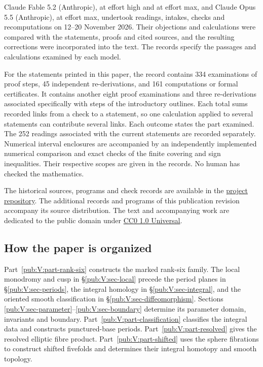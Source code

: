 Claude Fable 5.2 (Anthropic), at effort high and at effort max, and
Claude Opus 5.5 (Anthropic), at effort max, undertook readings, intakes,
checks and recomputations on 12--20 November 2026. Their objections
and calculations were compared with the statements, proofs and cited
sources, and the resulting corrections were incorporated into the text.
The records specify the passages and calculations examined by each model.

For the statements printed in this paper, the record contains
334 examinations of proof steps, 45 independent re-derivations, and
161 computations or formal certificates. It contains another eight
proof examinations and three re-derivations associated specifically
with steps of the introductory outlines. Each total sums recorded
links from a check to a statement, so one calculation applied to several
statements can contribute several links. Each outcome states the part
examined. The 252 readings associated with the current statements are
recorded separately. Numerical interval enclosures are accompanied by
an independently implemented numerical comparison and exact checks of
the finite covering and sign inequalities. Their respective scopes are
given in the records. No human has checked the mathematics.

The historical sources, programs and check records are available in the
\href{https://github.com/KokunoYumeto/s6-complex-structure-workbench/tree/\SsixRepositoryCommit/pro_returns/S6_SERIES_GRIND_checkpoint_10_20261120T0211Z/}{project repository}.
The additional records and programs of this publication revision
accompany its source distribution.
The text and accompanying work are dedicated to the public domain under
\href{https://creativecommons.org/publicdomain/zero/1.0/}{CC0 1.0 Universal}.

\subsection{How the paper is organized}
Part~\ref{pub:V:part-rank-six} constructs the marked rank-six family.
The local monodromy and cusp in \S\ref{pub:V:sec-local} precede the
period planes in \S\ref{pub:V:sec-periods}, the integral homology in
\S\ref{pub:V:sec-integral}, and the oriented smooth classification
in \S\ref{pub:V:sec-diffeomorphism}. Sections
\ref{pub:V:sec-parameter}--\ref{pub:V:sec-boundary} determine its
parameter domain, invariants and boundary.
Part~\ref{pub:V:part-classification} classifies the integral data and
constructs punctured-base periods. Part~\ref{pub:V:part-resolved}
gives the resolved elliptic fibre product. Part~\ref{pub:V:part-shifted}
uses the sphere fibrations to construct shifted fivefolds and determines
their integral homotopy and smooth topology.

